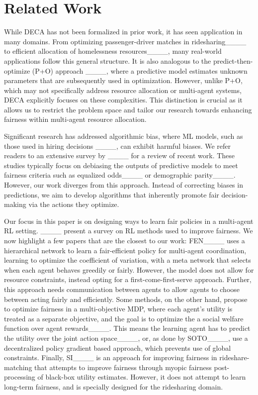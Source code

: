 \section{Related Work}
\label{sec:related}

While DECA has not been formalized in prior work, it has seen application in many domains. From optimizing passenger-driver matches in ridesharing____ to efficient allocation of homelessness resources____, many real-world applications follow this general structure. 
It is also analogous to the predict-then-optimize (P+O) approach ____, where a predictive model estimates unknown parameters that are subsequently used in optimization. However, unlike P+O, which may not specifically address resource allocation or multi-agent systems, DECA explicitly focuses on these complexities. This distinction is crucial as it allows us to restrict the problem space and tailor our research towards enhancing fairness within multi-agent resource allocation.

Significant research has addressed algorithmic bias, where ML models, such as those used in hiring decisions ____, can exhibit harmful biases. 
We refer readers to an extensive survey by ____ for a review of recent work.
These studies typically focus on debiasing the outputs of predictive models to meet fairness criteria such as equalized odds____ or demographic parity____. However, our work diverges from this approach. Instead of correcting biases in predictions, we aim to develop algorithms that inherently promote fair decision-making via the actions they optimize.

Our focus in this paper is on designing ways to learn fair policies in a multi-agent RL setting. ____ present a survey on RL methods used to improve fairness. We now highlight a few papers that are the closest to our work: FEN____ uses a hierarchical network to learn a fair-efficient policy for multi-agent coordination, learning to optimize the coefficient of variation, with a meta network that selects when each agent behaves greedily or fairly. However, the model does not allow for resource constraints, instead opting for a first-come-first-serve approach. Further, this approach needs communication between agents to allow agents to choose between acting fairly and efficiently. Some methods, on the other hand, propose to optimize fairness in a multi-objective MDP, where each agent's utility is treated as a separate objective, and the goal is to optimize the a social welfare function over agent rewards____. 
This means the learning agent has to predict the utility over the joint action space____, or, as done by SOTO____, use a decentralized policy gradient based approach, which prevents use of global constraints. 
Finally, SI____ is an approach for improving fairness in rideshare-matching that attempts to improve fairness through myopic fairness post-processing of black-box utility estimates. However, it does not attempt to learn long-term fairness, and is specially designed for the ridesharing domain.

